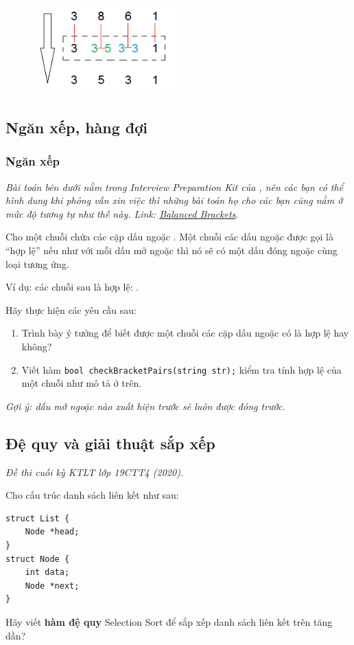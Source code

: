 \documentclass[main.tex]{subfiles}
\begin{document}
\begin{figure}[H]
\centering
\includegraphics[width=0.5\textwidth]{image/q_DSLK.png}
\end{figure}

\subsection{Ngăn xếp, hàng đợi}
\subsubsection{Ngăn xếp}
\textit{Bài toán bên dưới nằm trong Interview Preparation Kit của , nên các bạn có thể hình dung khi phỏng vấn xin việc thì những bài toán họ cho các bạn cũng nằm ở mức độ tương tự như thế này. Link: \href{https://www.hackerrank.com/challenges/balanced-brackets/}{Balanced Brackets}}.

Cho một chuỗi chứa các cặp dấu ngoặc \code{() [] {}}. Một chuỗi các dấu ngoặc được gọi là ``hợp lệ'' nếu như với mỗi dấu mở ngoặc thì nó sẽ có một dấu đóng ngoặc cùng loại tương ứng.

Ví dụ: các chuỗi sau là hợp lệ: . 

Hãy thực hiện các yêu cầu sau:
\begin{enumerate}[label=\alph*.]
    \item Trình bày ý tưởng để biết được một chuỗi các cặp dấu ngoặc có là hợp lệ hay không?
    \item Viết hàm \texttt{bool checkBracketPairs(string str);} kiểm tra tính hợp lệ của một chuỗi như mô tả ở trên.
\end{enumerate}
\textit{Gợi ý: dấu mở ngoặc nào xuất hiện trước sẽ luôn được đóng trước.}

\subsection{Đệ quy và giải thuật sắp xếp}
\textit{Đề thi cuối kỳ KTLT lớp 19CTT4 (2020).}

Cho cấu trúc danh sách liên kết như sau:
\begin{verbatim}
struct List {
    Node *head;
}
struct Node {
    int data;
    Node *next;
}
\end{verbatim}
Hãy viết \textbf{hàm đệ quy} Selection Sort để sắp xếp danh sách liên kết trên tăng dần?
\end{document}
